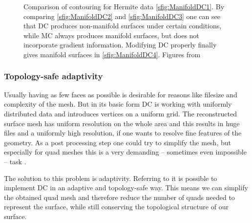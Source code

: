 \begin{figure}
\begin{center}
\begin{subfigure}[t]{.2\textwidth}
\begin{center}
\label{sfig:ManifoldDC4}
\end{center}
\end{subfigure}
\caption{Comparison of contouring for Hermite data \autoref{sfig:ManifoldDC1}. By comparing \autoref{sfig:ManifoldDC2} and \autoref{sfig:ManifoldDC3} one can see that \ac{DC} produces non-manifold surfaces under certain conditions, while \ac{MC} always produces manifold surfaces, but does not incorporate gradient information. Modifying \ac{DC} properly finally gives manifold surfaces in \autoref{sfig:ManifoldDC4}. Figures from \cite{Schaefer2007}}
\label{fig:manifold}
\end{center}
\end{figure}

\subsubsection{Topology-safe adaptivity}
Usually having as few faces as possible is desirable for reasons like filesize and complexity of the mesh. But in its basic form \ac{DC} is working with uniformly distributed data and introduces vertices on a uniform grid. The reconstructed surface mesh has uniform resolution on the whole area and this results in huge files and a uniformly high resolution, if one wants to resolve fine features of the geometry. As a post processing step one could try to simplify the mesh, but especially for \ac{quad} meshes this is a very demanding -- sometimes even impossible -- task \cite{Puppo2010}.

The solution to this problem is adaptivity. Referring to \cite{Hermite2002} it is possible to implement \ac{DC} in an adaptive and topology-safe way. This means we can simplify the obtained \ac{quad} mesh and therefore reduce the number of \acp{quad} needed to represent the surface, while still conserving the topological structure of our surface.

